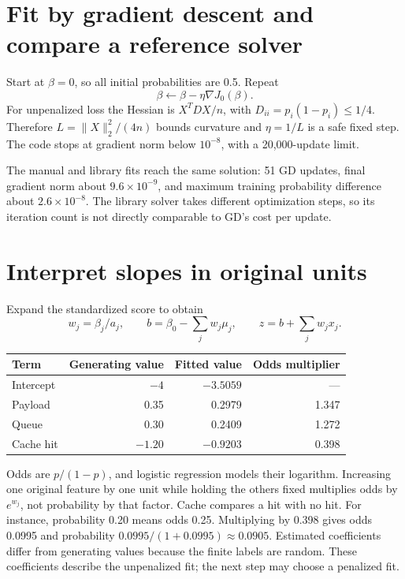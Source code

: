 \section{Fit by gradient descent and compare a reference solver}
Start at $\beta=0$, so all initial probabilities are 0.5. Repeat
\[\beta\leftarrow\beta-\eta\nabla J_0(\beta).\]
For unpenalized loss the Hessian is $X^TDX/n$, with $D_{ii}=p_i(1-p_i)\le1/4$. Therefore $L=\|X\|_2^2/(4n)$ bounds curvature and $\eta=1/L$ is a safe fixed step. The code stops at gradient norm below $10^{-8}$, with a 20,000-update limit.

The manual and library fits reach the same solution: 51 GD updates, final gradient norm about $9.6\times10^{-9}$, and maximum training probability difference about $2.6\times10^{-8}$. The library solver takes different optimization steps, so its iteration count is not directly comparable to GD's cost per update.

\section{Interpret slopes in original units}
Expand the standardized score to obtain
\[w_j=\beta_j/a_j,\qquad b=\beta_0-\sum_jw_j\mu_j,\qquad z=b+\sum_jw_jx_j.\]
\begin{center}
\begin{tabular}{lrrr}\toprule
Term&Generating value&Fitted value&Odds multiplier\\\midrule
Intercept&$-4$&$-3.5059$&---\\
Payload&0.35&0.2979&1.347\\
Queue&0.30&0.2409&1.272\\
Cache hit&$-1.20$&$-0.9203$&0.398\\\bottomrule
\end{tabular}
\end{center}
Odds are $p/(1-p)$, and logistic regression models their logarithm. Increasing one original feature by one unit while holding the others fixed multiplies odds by $e^{w_j}$, not probability by that factor. Cache compares a hit with no hit.
For instance, probability 0.20 means odds 0.25. Multiplying by 0.398 gives odds 0.0995 and probability $0.0995/(1+0.0995)\approx0.0905$. Estimated coefficients differ from generating values because the finite labels are random. These coefficients describe the unpenalized fit; the next step may choose a penalized fit.

